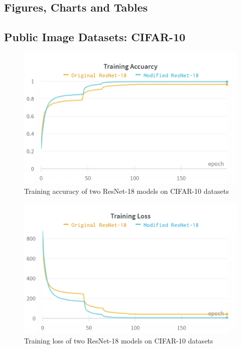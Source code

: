 \documentclass[twocolumn]{extarticle}
\begin{document}
\clearpage
{}%
\renewcommand*{\thepage}{A. \arabic{page}}
\begin{appendices}
\section{Figures, Charts and Tables}

\subsection{Public Image Datasets: CIFAR-10}

\begin{figure}[H]
\centering
\includegraphics[width=0.9\linewidth]{charts/Section-2-Panel-0-uzzeut0la}
\caption{Training accuracy of two ResNet-18 models on CIFAR-10 datasets}
\label{chart: res_1}
\end{figure}

\begin{figure}[H]
\centering
\includegraphics[width=0.9\linewidth]{charts/Section-2-Panel-1-crmf3l46q}
\caption{Training loss of two ResNet-18 models on CIFAR-10 datasets}
\label{chart: res_2}
\end{figure}


\end{appendices}
\end{document}
